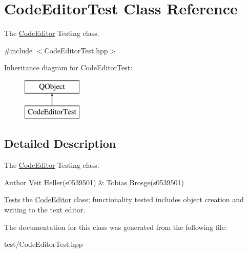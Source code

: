 \hypertarget{classCodeEditorTest}{\section{Code\+Editor\+Test Class Reference}
\label{classCodeEditorTest}
}


The \hyperlink{classCodeEditor}{Code\+Editor} Testing class.  




{\ttfamily \#include $<$Code\+Editor\+Test.\+hpp$>$}

Inheritance diagram for Code\+Editor\+Test\+:\begin{figure}[H]
\begin{center}
\leavevmode
\includegraphics[height=2.000000cm]{classCodeEditorTest}
\end{center}
\end{figure}


\subsection{Detailed Description}
The \hyperlink{classCodeEditor}{Code\+Editor} Testing class. 

\begin{DoxyAuthor}{Author}
Veit Heller(s0539501) \& Tobias Brosge(s0539501)
\end{DoxyAuthor}
\hyperlink{structTests}{Tests} the \hyperlink{classCodeEditor}{Code\+Editor} class; functionality tested includes object creation and writing to the text editor. 

The documentation for this class was generated from the following file\+:\begin{DoxyCompactItemize}
\item 
test/Code\+Editor\+Test.\+hpp\end{DoxyCompactItemize}
